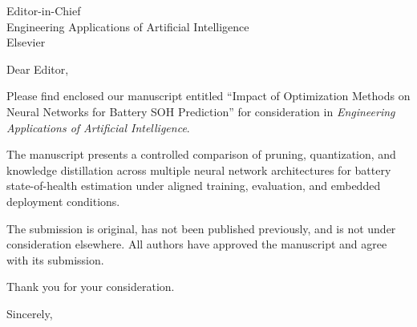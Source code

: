 ﻿\documentclass[11pt]{letter}
\date{\today}
\begin{document}
\begin{letter}{Editor-in-Chief\\Engineering Applications of Artificial Intelligence\\Elsevier}

\opening{Dear Editor,}

Please find enclosed our manuscript entitled ``Impact of Optimization Methods on Neural Networks for Battery SOH Prediction'' for consideration in \textit{Engineering Applications of Artificial Intelligence}.

The manuscript presents a controlled comparison of pruning, quantization, and knowledge distillation across multiple neural network architectures for battery state-of-health estimation under aligned training, evaluation, and embedded deployment conditions.

The submission is original, has not been published previously, and is not under consideration elsewhere. All authors have approved the manuscript and agree with its submission.

Thank you for your consideration.

\closing{Sincerely,}

\end{letter}
\end{document}
